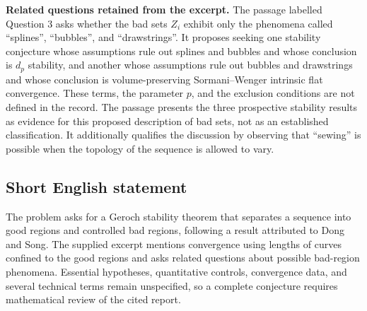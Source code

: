 \documentclass[11pt]{article}
\begin{document}
\textbf{Related questions retained from the excerpt.} The passage labelled Question 3 asks whether the bad sets \(Z_i\) exhibit only the phenomena called ``splines'', ``bubbles'', and ``drawstrings''. It proposes seeking one stability conjecture whose assumptions rule out splines and bubbles and whose conclusion is \(d_p\) stability, and another whose assumptions rule out bubbles and drawstrings and whose conclusion is volume-preserving Sormani--Wenger intrinsic flat convergence. These terms, the parameter \(p\), and the exclusion conditions are not defined in the record. The passage presents the three prospective stability results as evidence for this proposed description of bad sets, not as an established classification. It additionally qualifies the discussion by observing that ``sewing'' is possible when the topology of the sequence is allowed to vary.
\subsection{Short English statement}
The problem asks for a Geroch stability theorem that separates a sequence into good regions and controlled bad regions, following a result attributed to Dong and Song. The supplied excerpt mentions convergence using lengths of curves confined to the good regions and asks related questions about possible bad-region phenomena. Essential hypotheses, quantitative controls, convergence data, and several technical terms remain unspecified, so a complete conjecture requires mathematical review of the cited report.
\end{document}
